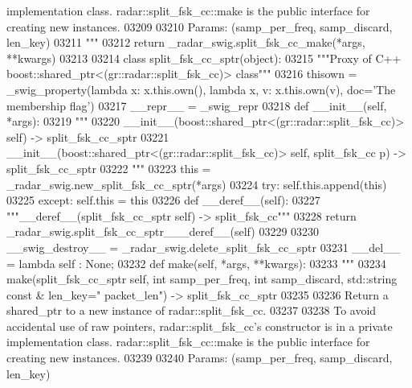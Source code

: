 \begin{DoxyCode}
{{{{{{{{{{{{{       implementation class. radar::split\_fsk\_cc::make is the public interface for creating new instances.}
03209 \textcolor{stringliteral}{}
03210 \textcolor{stringliteral}{    Params: (samp\_per\_freq, samp\_discard, len\_key)}
03211 \textcolor{stringliteral}{    """}
03212   \textcolor{keywordflow}{return} \_radar\_swig.split\_fsk\_cc\_make(*args, **kwargs)
03213 
03214 \textcolor{keyword}{class }split_fsk_cc_sptr(object):
03215     \textcolor{stringliteral}{"""Proxy of C++ boost::shared\_ptr<(gr::radar::split\_fsk\_cc)> class"""}
03216     thisown = _swig_property(\textcolor{keyword}{lambda} x: x.this.own(), \textcolor{keyword}{lambda} x, v: x.this.own(v), doc=\textcolor{stringliteral}{'The membership flag'})
03217     \_\_repr\_\_ = \_swig\_repr
03218     \textcolor{keyword}{def }__init__(self, *args): 
03219         \textcolor{stringliteral}{"""}
03220 \textcolor{stringliteral}{        \_\_init\_\_(boost::shared\_ptr<(gr::radar::split\_fsk\_cc)> self) -> split\_fsk\_cc\_sptr}
03221 \textcolor{stringliteral}{        \_\_init\_\_(boost::shared\_ptr<(gr::radar::split\_fsk\_cc)> self, split\_fsk\_cc p) -> split\_fsk\_cc\_sptr}
03222 \textcolor{stringliteral}{        """}
03223         this = \_radar\_swig.new\_split\_fsk\_cc\_sptr(*args)
03224         \textcolor{keywordflow}{try}: self.this.append(this)
03225         \textcolor{keywordflow}{except}: self.this = this
03226     \textcolor{keyword}{def }__deref__(self):
03227         \textcolor{stringliteral}{"""\_\_deref\_\_(split\_fsk\_cc\_sptr self) -> split\_fsk\_cc"""}
03228         \textcolor{keywordflow}{return} \_radar\_swig.split\_fsk\_cc\_sptr\_\_\_deref\_\_(self)
03229 
03230     \_\_swig\_destroy\_\_ = \_radar\_swig.delete\_split\_fsk\_cc\_sptr
03231     \_\_del\_\_ = \textcolor{keyword}{lambda} self : \textcolor{keywordtype}{None};
03232     \textcolor{keyword}{def }make(self, *args, **kwargs):
03233         \textcolor{stringliteral}{"""}
03234 \textcolor{stringliteral}{        make(split\_fsk\_cc\_sptr self, int samp\_per\_freq, int samp\_discard, std::string const & len\_key="
      packet\_len") -> split\_fsk\_cc\_sptr}
03235 \textcolor{stringliteral}{}
03236 \textcolor{stringliteral}{        Return a shared\_ptr to a new instance of radar::split\_fsk\_cc.}
03237 \textcolor{stringliteral}{}
03238 \textcolor{stringliteral}{        To avoid accidental use of raw pointers, radar::split\_fsk\_cc's constructor is in a private
       implementation class. radar::split\_fsk\_cc::make is the public interface for creating new instances.}
03239 \textcolor{stringliteral}{}
03240 \textcolor{stringliteral}{        Params: (samp\_per\_freq, samp\_discard, len\_key)}
}}}}}}}}}}}}
\end{DoxyCode}
